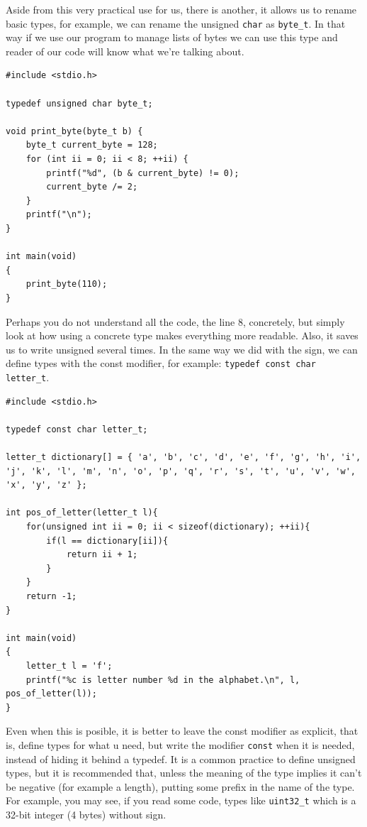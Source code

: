 \documentclass[a4paper]{article}
\begin{document}
Aside from this very practical use for us, there is another, it allows us to
rename basic types, for example, we can rename the unsigned \verb!char! as
\verb!byte_t!. In that way if we use our program to manage lists of bytes we can
use this type and reader of our code will know what we're talking about.

\noindent
\begin{minipage}[H]{\linewidth}
\mbox{}
\begin{lstlisting}[style=C,
caption={Redefining basic types},
label={lst:typedefBasicType}]
#include <stdio.h>

typedef unsigned char byte_t;

void print_byte(byte_t b) {
    byte_t current_byte = 128;
    for (int ii = 0; ii < 8; ++ii) {
        printf("%d", (b & current_byte) != 0);
        current_byte /= 2;
    }
    printf("\n");
}

int main(void)
{
    print_byte(110);
}
\end{lstlisting}
\end{minipage}

Perhaps you do not understand all the code, the line 8, concretely, but simply
look at how using a concrete type makes everything more readable. Also, it
saves us to write unsigned several times. In the same way we did with the sign,
we can define types with the const modifier, for example:
\verb!typedef const char letter_t!.

\noindent
\begin{minipage}[H]{\linewidth}
\mbox{}
\begin{lstlisting}[style=C,
caption={Example of definition of a type with const modifier},
label={lst:typedefConstType}]
#include <stdio.h>

typedef const char letter_t;

letter_t dictionary[] = { 'a', 'b', 'c', 'd', 'e', 'f', 'g', 'h', 'i', 'j', 'k', 'l', 'm', 'n', 'o', 'p', 'q', 'r', 's', 't', 'u', 'v', 'w', 'x', 'y', 'z' };

int pos_of_letter(letter_t l){
    for(unsigned int ii = 0; ii < sizeof(dictionary); ++ii){
        if(l == dictionary[ii]){
            return ii + 1;
        }
    }
    return -1;
}

int main(void)
{
    letter_t l = 'f';
    printf("%c is letter number %d in the alphabet.\n", l, pos_of_letter(l));
}
\end{lstlisting}
\end{minipage}

Even when this is posible, it is better to leave the const modifier as explicit,
that is, define types for what u need, but write the modifier \verb!const! when
it is needed, instead of hiding it behind a typedef. It is a common practice
to define unsigned types, but it is recommended that, unless the meaning of the
type implies it can't be negative (for example a length), putting some prefix in
the name of the type. For example, you may see, if you read some code, types
like \verb!uint32_t! which is a 32-bit integer (4 bytes) without sign.
\end{document}
